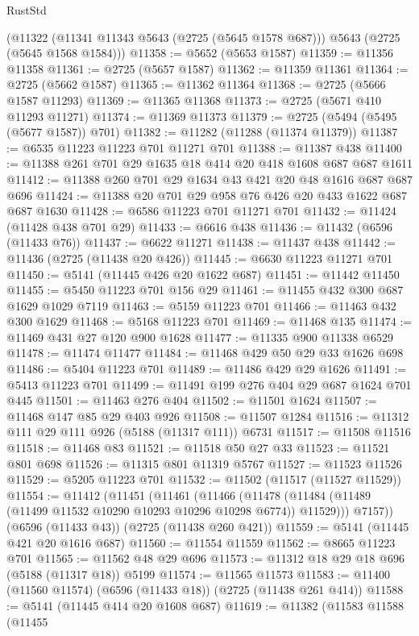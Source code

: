 \begin{lexlean}{RustStd}
\begin{coremodule}
    (@11322 (@11341 @11343 @5643 (@2725 (@5645 @1578 @687))) @5643 (@2725 (@5645 @1568 @1584)))
@11358 := @5652 (@5653 @1587)
@11359 := @11356 @11358
@11361 := @2725 (@5657 @1587)
@11362 := @11359 @11361
@11364 := @2725 (@5662 @1587)
@11365 := @11362 @11364
@11368 := @2725 (@5666 @1587 @11293)
@11369 := @11365 @11368
@11373 := @2725 (@5671 @410 @11293 @11271)
@11374 := @11369 @11373
@11379 := @2725 (@5494 (@5495 (@5677 @1587)) @701)
@11382 := @11282 (@11288 (@11374 @11379))
@11387 := @6535 @11223 @11223 @701 @11271 @701
@11388 := @11387 @438
@11400 := @11388 @261 @701 @29 @1635 @18 @414 @20 @418 @1608 @687 @687 @1611
@11412 := @11388 @260 @701 @29 @1634 @43 @421 @20 @48 @1616 @687 @687 @696
@11424 := @11388 @20 @701 @29 @958 @76 @426 @20 @433 @1622 @687 @687 @1630
@11428 := @6586 @11223 @701 @11271 @701
@11432 := @11424 (@11428 @438 @701 @29)
@11433 := @6616 @438
@11436 := @11432 (@6596 (@11433 @76))
@11437 := @6622 @11271
@11438 := @11437 @438
@11442 := @11436 (@2725 (@11438 @20 @426))
@11445 := @6630 @11223 @11271 @701
@11450 := @5141 (@11445 @426 @20 @1622 @687)
@11451 := @11442 @11450
@11455 := @5450 @11223 @701 @156 @29
@11461 := @11455 @432 @300 @687 @1629 @1029 @7119
@11463 := @5159 @11223 @701
@11466 := @11463 @432 @300 @1629
@11468 := @5168 @11223 @701
@11469 := @11468 @135
@11474 := @11469 @431 @27 @120 @900 @1628
@11477 := @11335 @900 @11338 @6529
@11478 := @11474 @11477
@11484 := @11468 @429 @50 @29 @33 @1626 @698
@11486 := @5404 @11223 @701
@11489 := @11486 @429 @29 @1626
@11491 := @5413 @11223 @701
@11499 := @11491 @199 @276 @404 @29 @687 @1624 @701 @445
@11501 := @11463 @276 @404
@11502 := @11501 @1624
@11507 := @11468 @147 @85 @29 @403 @926
@11508 := @11507 @1284
@11516 := @11312 @111 @29 @111 @926 (@5188 (@11317 @111)) @6731
@11517 := @11508 @11516
@11518 := @11468 @83
@11521 := @11518 @50 @27 @33
@11523 := @11521 @801 @698
@11526 := @11315 @801 @11319 @5767
@11527 := @11523 @11526
@11529 := @5205 @11223 @701
@11532 := @11502 (@11517 (@11527 @11529))
@11554 := @11412
    (@11451
      (@11461
        (@11466 (@11478 (@11484 (@11489 (@11499 @11532 @10290 @10293 @10296 @10298 @6774)) @11529)))
        @7157))
    (@6596 (@11433 @43))
    (@2725 (@11438 @260 @421))
@11559 := @5141 (@11445 @421 @20 @1616 @687)
@11560 := @11554 @11559
@11562 := @8665 @11223 @701
@11565 := @11562 @48 @29 @696
@11573 := @11312 @18 @29 @18 @696 (@5188 (@11317 @18)) @5199
@11574 := @11565 @11573
@11583 := @11400 (@11560 @11574) (@6596 (@11433 @18)) (@2725 (@11438 @261 @414))
@11588 := @5141 (@11445 @414 @20 @1608 @687)
@11619 := @11382
    (@11583
      @11588
      (@11455

\end{coremodule}
\end{lexlean}
